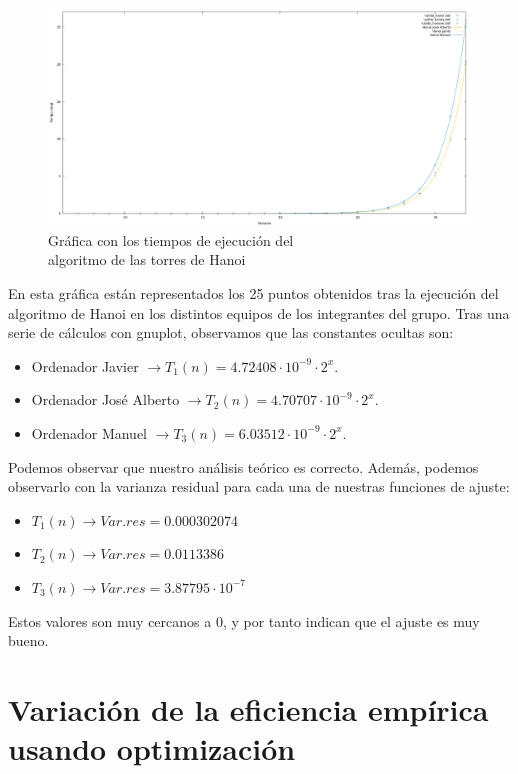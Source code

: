 \documentclass[10pt,a4paper]{article}
\begin{document}
\begin{figure}[h!]
\centering
\includegraphics[scale=0.17]{../../Images/hanoi_combinados.png}
\caption{Gráfica con los tiempos de ejecución del \\algoritmo de las torres de Hanoi}
\end{figure}

En esta gráfica están representados los 25 puntos obtenidos tras la ejecución del algoritmo de Hanoi en los distintos equipos de los integrantes del grupo. Tras una serie de cálculos con gnuplot, observamos que las constantes ocultas son:
\begin{itemize}
	\item Ordenador Javier \(\rightarrow T_1(n) = 4.72408 \cdot 10^{-9} \cdot 2^x\).
	\item Ordenador José Alberto \(\rightarrow T_2(n) = 4.70707 \cdot 10^{-9} \cdot 2^x\).
	\item Ordenador Manuel \(\rightarrow T_3(n) = 6.03512 \cdot 10^{-9} \cdot 2^x\).
\end{itemize}

Podemos observar que nuestro análisis teórico es correcto. Además, podemos observarlo con la varianza residual para cada una de nuestras funciones de ajuste:
\begin{itemize}
	\item \(T_1(n) \longrightarrow Var.res = 0.000302074\)
	\item \(T_2(n) \longrightarrow Var.res = 0.0113386\)
	\item \(T_3(n) \longrightarrow Var.res = 3.87795 \cdot 10^{-7}\)
\end{itemize}

Estos valores son muy cercanos a 0, y por tanto indican que el ajuste es muy bueno.

\section{Variación de la eficiencia empírica usando optimización}
\end{document}
